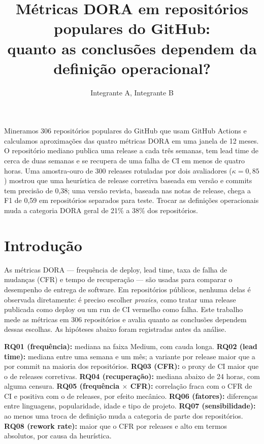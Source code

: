 \documentclass[12pt]{article}
\title{Métricas DORA em repositórios populares do GitHub:\\
quanto as conclusões dependem da definição operacional?}
\author{Integrante A\inst{1}, Integrante B\inst{1}}
\begin{document}
\maketitle

\begin{resumo}
Mineramos 306 repositórios populares do GitHub que usam GitHub Actions e
calculamos aproximações das quatro métricas DORA em uma janela de 12 meses.
O repositório mediano publica uma release a cada três semanas, tem lead time
de cerca de duas semanas e se recupera de uma falha de CI em menos de quatro
horas. Uma amostra-ouro de 300 releases rotuladas por dois avaliadores
($\kappa=0{,}85$) mostrou que uma heurística de release corretiva baseada em
versão e commits tem precisão de 0,38; uma versão revista, baseada nas notas
de release, chega a F1 de 0,59 em repositórios separados para teste. Trocar
as definições operacionais muda a categoria DORA geral de 21\% a 38\% dos
repositórios.
\end{resumo}

\section{Introdução}

As métricas DORA --- frequência de deploy, lead time, taxa de falha de
mudanças (CFR) e tempo de recuperação --- são usadas para comparar o
desempenho de entrega de software. Em repositórios públicos, nenhuma delas é
observada diretamente: é preciso escolher \emph{proxies}, como tratar uma
release publicada como deploy ou um run de CI vermelho como falha. Este
trabalho mede as métricas em 306 repositórios e avalia quanto as conclusões
dependem dessas escolhas. As hipóteses abaixo foram registradas antes da
análise.

\textbf{RQ01 (frequência):} mediana na faixa Medium, com cauda longa.
\textbf{RQ02 (lead time):} mediana entre uma semana e um mês; a variante por
release maior que a por commit na maioria dos repositórios.
\textbf{RQ03 (CFR):} o proxy de CI maior que o de releases corretivas.
\textbf{RQ04 (recuperação):} mediana abaixo de 24 horas, com alguma censura.
\textbf{RQ05 (frequência $\times$ CFR):} correlação fraca com o CFR de CI e
positiva com o de releases, por efeito mecânico.
\textbf{RQ06 (fatores):} diferenças entre linguagens, popularidade, idade e
tipo de projeto.
\textbf{RQ07 (sensibilidade):} ao menos uma troca de definição muda a
categoria de parte dos repositórios.
\textbf{RQ08 (rework rate):} maior que o CFR por releases e alto em termos
absolutos, por causa da heurística.
\end{document}
